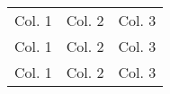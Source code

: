 \documentclass[a4paper,12pt]{article}
\begin{document}
	
	\linhabase\hfill
	\begin{tabular}[c]{ccc}	
		\cellcolor{red!50} Col. 1  &                    Col. 2 & \cellcolor{green!50}  Col. 3 \\
		                   Col. 1  & \cellcolor{blue!50}Col. 2 &                       Col. 3 \\
		\cellcolor{cyan!50}Col. 1 &                     Col. 2 & \cellcolor{magenta!50}Col. 3
	\end{tabular}%
	\hfill\null
\end{document}
